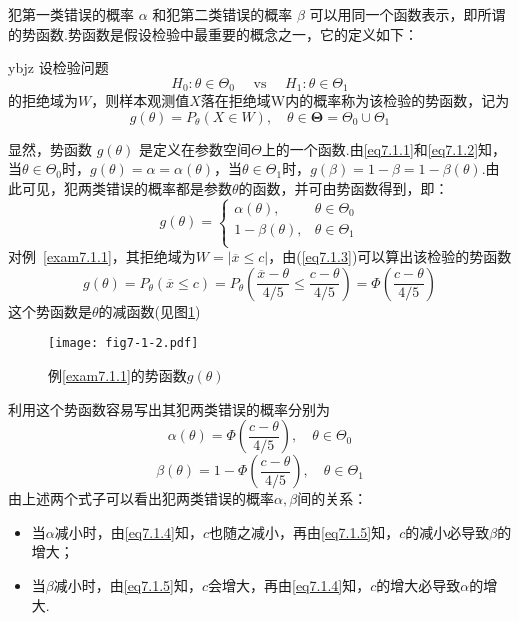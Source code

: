 犯第一类错误的概率 $\alpha$ 和犯第二类错误的概率 $\beta$ 可以用同一个函数表示，即所谓的势函数.势函数是假设检验中最重要的概念之一，它的定义如下：
\begin{definition}{}{ybjz}
	设检验问题
	\[H _ { 0 } : \theta \in \Theta _ { 0 } \quad \text { vs } \quad H _ { 1 } : \theta \in \Theta  _ { 1 }\]
	的拒绝域为$W$，则样本观测值$X$落在拒绝域W内的概率称为该检验的势函数，记为
	\begin{equation}\label{eq7.1.3}
	g\left(\theta\right)=P_{\theta}\left(X\in  W\right),\quad\theta\in\boldsymbol{\Theta }=\Theta_0\cup\Theta_1
	\end{equation}
\end{definition}
显然，势函数 $g(\theta)$ 是定义在参数空间$\Theta$上的一个函数.由\ref{eq7.1.1}和\ref{eq7.1.2}知，当$\theta \in \Theta_{ 0 }$时，$g ( \theta ) = \alpha = \alpha ( \theta )$，当$\theta \in \Theta_{1 }$时，$g ( \beta ) = 1-\beta = 1-\beta ( \theta )$.由此可见，犯两类错误的概率都是参数$\theta$的函数，并可由势函数得到，即：
\[
g\left(\theta\right)=\left\{\begin{matrix}
\alpha\left(\theta\right),&		\theta\in\Theta_0\\
1-\beta\left(\theta\right),&		\theta\in\Theta_1\\
\end{matrix}\right. 
\]
对例~\ref{exam7.1.1}，其拒绝域为$W = | \overline{ x } \leq c |$，由(\ref{eq7.1.3})可以算出该检验的势函数
\[
g\left(\theta\right)=P_{\theta}\left(\overline{x}\leq c\right)=P_{\theta}\left(\frac{\overline{x}-\theta}{4/5}\le\frac{c-\theta}{4/5}\right)=\Phi\left(\frac{c-\theta}{4/5}\right)
\]
这个势函数是$\theta$的减函数(见图\ref{fig7.1.2})
\begin{figure}[htbp]
	\centering
	\texttt{[image: fig7-1-2.pdf]}
	\caption{例\ref{exam7.1.1}的势函数$g(\theta)$}\label{fig7.1.2}
\end{figure}

利用这个势函数容易写出其犯两类错误的概率分别为
\begin{equation}\label{eq7.1.4}
\alpha\left(\theta\right)=\Phi\left(\frac{c-\theta}{4/5}\right),\quad\theta\in\Theta_0
\end{equation}
\begin{equation}\label{eq7.1.5}
\beta\left(\theta\right)=1-\Phi\left(\frac{c-\theta}{4/5}\right),\quad\theta\in\Theta_1
\end{equation}
由上述两个式子可以看出犯两类错误的概率$\alpha,\beta$间的关系：
\begin{itemize}
	\item 当$\alpha$减小时，由\ref{eq7.1.4}知，$c$也随之减小，再由\ref{eq7.1.5}知，$c$的减小必导致$\beta$的增大；
	\item 当$\beta$减小时，由\ref{eq7.1.5}知，$c$会增大，再由\ref{eq7.1.4}知，$c$的增大必导致$\alpha$的增大.
	
\end{itemize}

